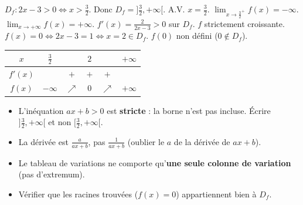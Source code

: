 \documentclass[11pt]{article}
\newcommand{\legende}[1]{\par\vspace{6pt}{\popsemi\fontsize{9}{11.5}\selectfont\color{popmuted}#1}}
\begin{document}
\begin{exemplebox}[Étude de $f(x) = \ln(2x-3)$]
$D_f : 2x-3 > 0 \iff x > \frac{3}{2}$. Donc $D_f = ]\frac{3}{2}, +\infty[$.
A.V. $x = \frac{3}{2}$. $\lim_{x\to \frac{3}{2}^+} f(x) = -\infty$. $\lim_{x\to +\infty} f(x) = +\infty$.
$f'(x) = \frac{2}{2x-3} > 0$ sur $D_f$. $f$ strictement croissante.
$f(x)=0 \iff 2x-3=1 \iff x=2 \in D_f$.
$f(0)$ non défini ($0 \notin D_f$).
\begin{center}
\begin{tabular}{|c|ccccc|}\hline
$x$ & $\frac{3}{2}$ & & $2$ & & $+\infty$ \\ \hline
$f'(x)$ & & $+$ & $+$ & $+$ & \\ \hline
$f(x)$ & $-\infty$ & $\nearrow$ & $0$ & $\nearrow$ & $+\infty$ \\ \hline
\end{tabular}
\end{center}
\tcblower
\begin{popfigure}
\legende{Courbe de $f(x)=\ln(2x-3)$.}
\end{popfigure}
\end{exemplebox}

\begin{attention}
\begin{itemize}
  \item L'inéquation $ax+b > 0$ est \textbf{stricte} : la borne n'est pas incluse. Écrire $] \frac{3}{2}, +\infty[$ et non $[\frac{3}{2}, +\infty[$.
  \item La dérivée est $\frac{a}{ax+b}$, pas $\frac{1}{ax+b}$ (oublier le $a$ de la dérivée de $ax+b$).
  \item Le tableau de variations ne comporte qu'\textbf{une seule colonne de variation} (pas d'extremum).
  \item Vérifier que les racines trouvées ($f(x)=0$) appartiennent bien à $D_f$.
\end{itemize}
\end{attention}
\end{document}
